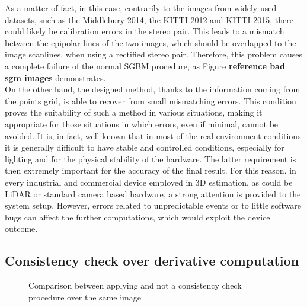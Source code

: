 As a matter of fact, in this case, contrarily to the images from widely-used datasets, such as the Middlebury 2014, the KITTI 2012 and KITTI 2015, there could likely be calibration errors in the stereo pair.
This leads to a mismatch between the epipolar lines of the two images, which should be overlapped to the image scanlines, when using a rectified stereo pair. 
Therefore, this problem causes a complete failure of the normal SGBM procedure, as Figure \textbf{reference bad sgm images} demonstrates.\\
On the other hand, the designed method, thanks to the information coming from the points grid, is able to recover from small mismatching errors.
This condition proves the suitability of such a method in various situations, making it appropriate for those situations in which errors, even if minimal, cannot be avoided. 
It is, in fact, well known that in most of the real environment conditions it is generally difficult to have stable and controlled conditions, especially for lighting and for the physical stability of the hardware. 
The latter requirement is then extremely important for the accuracy of the final result. 
For this reason, in every industrial and commercial device employed in 3D estimation, as could be LiDAR or standard camera based hardware, a strong attention is provided to the system setup. 
However, errors related to unpredictable events or to little software bugs can affect the further computations, which would exploit the device outcome. 

\subsection{Consistency check over derivative computation}
\label{subsection:result-consistency-check}

\begin{figure}[t]
	\centering
\caption{Comparison between applying and not a consistency check procedure over the same image}
\label{fig:consistency-check-comparison-moto-01}
\end{figure}


